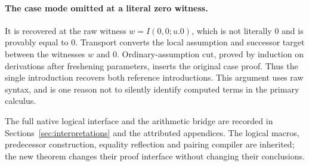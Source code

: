 \paragraph{The case mode omitted at a literal zero witness.}
It is recovered at the raw witness $w=I(0,0;u.0)$, which is not literally
$0$ and is provably equal to $0$. Transport converts the local assumption
and successor target between the witnesses $w$ and $0$. Ordinary-assumption
cut, proved by induction on derivations after freshening parameters, inserts
the original case proof. Thus the single introduction recovers both
reference introductions. This argument uses raw syntax, and is one reason
not to silently identify computed terms in the primary calculus.

The full native logical interface and the arithmetic bridge are recorded
in Sections~\ref{sec:interpretations} and the attributed appendices. The
logical macros, predecessor construction, equality reflection and pairing
compiler are inherited; the new theorem changes their proof interface
without changing their conclusions.
